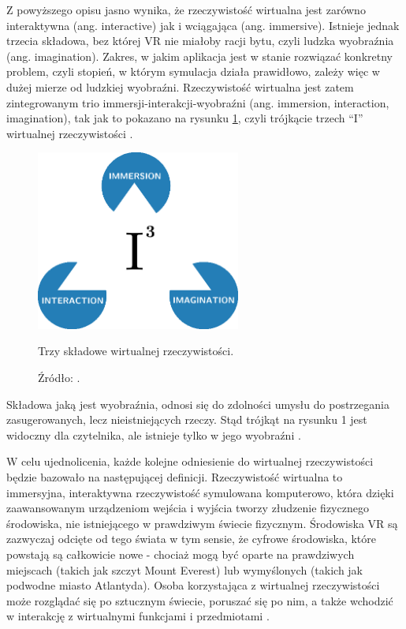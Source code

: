 Z powyższego opisu jasno wynika, że rzeczywistość wirtualna jest zarówno interaktywna (ang. interactive) jak i wciągająca (ang. immersive). Istnieje jednak trzecia składowa, bez której VR nie miałoby racji bytu, czyli ludzka wyobraźnia (ang. imagination). Zakres, w jakim aplikacja jest w stanie rozwiązać konkretny problem, czyli stopień, w którym symulacja działa prawidłowo, zależy więc w dużej mierze od ludzkiej wyobraźni. Rzeczywistość wirtualna jest zatem zintegrowanym trio immersji-interakcji-wyobraźni (ang. immersion, interaction, imagination), tak jak to pokazano na rysunku \ref{fig:triangle}, czyli trójkącie trzech ``I'' wirtualnej rzeczywistości \citep{virtualtech}.


\begin{figure}[h]
	\centering
	\includegraphics[width=0.6\textwidth]{images/triangle.png}
	\caption{Trzy składowe wirtualnej rzeczywistości.}
	\caption*{Źródło: \citep[s.~5]{virtualtech}.}
	\label{fig:triangle}
\end{figure}

Składowa jaką jest wyobraźnia, odnosi się do zdolności umysłu do postrzegania zasugerowanych, lecz nieistniejących rzeczy. Stąd trójkąt na rysunku 1 jest widoczny dla czytelnika, ale istnieje tylko w jego wyobraźni \citep{virtualtech}.

W celu ujednolicenia, każde kolejne odniesienie do wirtualnej rzeczywistości będzie bazowało na następującej definicji. Rzeczywistość wirtualna to immersyjna, interaktywna rzeczywistość symulowana komputerowo, która dzięki zaawansowanym urządzeniom wejścia i wyjścia tworzy złudzenie fizycznego środowiska, nie istniejącego w prawdziwym świecie fizycznym. Środowiska VR są zazwyczaj odcięte od tego świata w tym sensie, że cyfrowe środowiska, które powstają są całkowicie nowe - chociaż mogą być oparte na prawdziwych miejscach (takich jak szczyt Mount Everest) lub wymyślonych (takich jak podwodne miasto Atlantyda). Osoba korzystająca z wirtualnej rzeczywistości może rozglądać się po sztucznym świecie, poruszać się po nim, a także wchodzić w interakcję z wirtualnymi funkcjami i przedmiotami \citep{virtualfor}.

